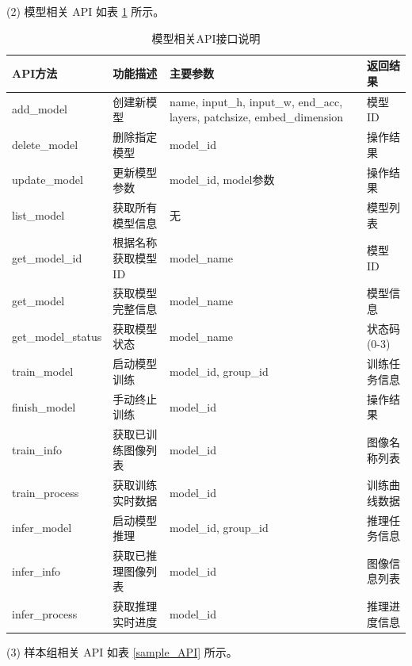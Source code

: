 \documentclass[
  ]{njuthesis}
\begin{document}
(2) 模型相关 API 如表 \ref{model_API} 所示。

\begin{table}[H]
    \centering
    \caption{模型相关API接口说明}
    \label{model_API}
    \renewcommand\arraystretch{0.5}
    \begin{tabular}{p{2.5cm}p{3.5cm}p{4cm}p{2.5cm}}
    \toprule[1.5pt]
    API方法 & 功能描述 & 主要参数 & 返回结果 \\
    \midrule[1pt]
    add\_model & 创建新模型 & name, input\_h, input\_w, end\_acc, layers, patchsize, embed\_dimension & 模型ID \\
    \midrule[0.5pt]
    delete\_model & 删除指定模型 & model\_id & 操作结果 \\
    \midrule[0.5pt]
    update\_model & 更新模型参数 & model\_id, model参数 & 操作结果 \\
    \midrule[0.5pt]
    list\_model & 获取所有模型信息 & 无 & 模型列表 \\
    \midrule[0.5pt]
    get\_model\_id & 根据名称获取模型ID & model\_name & 模型ID \\
    \midrule[0.5pt]
    get\_model & 获取模型完整信息 & model\_name & 模型信息 \\
    \midrule[0.5pt]
    get\_model\_status & 获取模型状态 & model\_name & 状态码(0-3) \\
    \midrule[0.5pt]
    train\_model & 启动模型训练 & model\_id, group\_id & 训练任务信息 \\
    \midrule[0.5pt]
    finish\_model & 手动终止训练 & model\_id & 操作结果 \\
    \midrule[0.5pt]
    train\_info & 获取已训练图像列表 & model\_id & 图像名称列表 \\
    \midrule[0.5pt]
    train\_process & 获取训练实时数据 & model\_id & 训练曲线数据 \\
    \midrule[0.5pt]
    infer\_model & 启动模型推理 & model\_id, group\_id & 推理任务信息 \\
    \midrule[0.5pt]
    infer\_info & 获取已推理图像列表 & model\_id & 图像信息列表 \\
    \midrule[0.5pt]
    infer\_process & 获取推理实时进度 & model\_id & 推理进度信息 \\
    \bottomrule[1.5pt]
    \end{tabular}
\end{table}

(3) 样本组相关 API 如表 \ref{sample_API} 所示。
\end{document}
